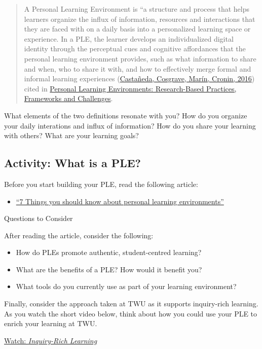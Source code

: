 \documentclass[
]{book}
\providecommand{\tightlist}{%
  \setlength{\itemsep}{0pt}\setlength{\parskip}{0pt}}
\theoremstyle{definition}
\theoremstyle{definition}
\theoremstyle{definition}
\theoremstyle{definition}
\theoremstyle{remark}
\begin{document}
\begin{quote}
A Personal Learning Environment is ``a structure and process that helps learners organize the influx of information, resources and interactions that they are faced with on a daily basis into a personalized learning space or experience. In a PLE, the learner develops an individualized digital identity through the perceptual cues and cognitive affordances that the personal learning environment provides, such as what information to share and when, who to share it with, and how to effectively merge formal and informal learning experiences (\href{https://naerjournal.ua.es/article/view/v6n1-introduction\#}{Castañeda, Cosgrave, Marín, Cronin, 2016}) cited in \href{https://naerjournal.ua.es/article/view/v6n1-introduction}{Personal Learning Environments: Research-Based Practices, Frameworks and Challenges}.
\end{quote}

What elements of the two definitions resonate with you? How do you organize your daily interations and influx of information? How do you share your learning with others? What are your learning goals?

\hypertarget{activity-what-is-a-ple}{%
\subsection*{Activity: What is a PLE?}\label{activity-what-is-a-ple}}

\begin{reflect}
Before you start building your PLE, read the following article:

\begin{itemize}
\tightlist
\item
  \href{assets/u4/U4_7-things-you-should-know-about-PLNs.pdf}{``7 Things you should know about personal learning environments''}
\end{itemize}

{Questions to Consider}

After reading the article, consider the following:

\begin{itemize}
\tightlist
\item
  How do PLEs promote authentic, student-centred learning?
\item
  What are the benefits of a PLE? How would it benefit you?
\item
  What tools do you currently use as part of your learning environment?
\end{itemize}

Finally, consider the approach taken at TWU as it supports inquiry-rich learning. As you watch the short video below, think about how you could use your PLE to enrich your learning at TWU.

\href{https://www.youtube.com/watch?v=SCa9Nt3X1vU}{Watch: \emph{Inquiry-Rich Learning}}
\end{reflect}
\end{document}
